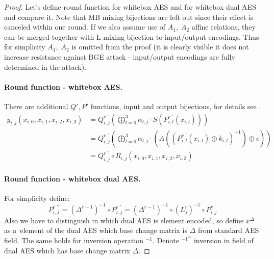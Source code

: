 \documentclass[11pt,oneside,final]{fithesis2}
\begin{document}
	\begin{proof}
	Let's define round function for whitebox AES and for whitebox dual AES and compare it. 
	Note that MB mixing bijections are left out since their effect is canceled within one round. If we also assume use of $A_1, \; A_2$ affine relations,
	they can be merged together with L mixing bijection to input/output encodings. Thus for simplicity $A_1, \; A_2$ is omitted from the proof (it is clearly visible 
	it does not increase resistance against BGE attack - input/output encodings are fully determined in the attack).

	\paragraph*{Round function - whitebox AES.}
	There are additional $Q' ,P' $ functions, input and output bijections, for details see \citep{Chow02white-boxcryptography} \citep{Billet:2004:CWB:2080787.2080809}.
	\begin{subequations}
	\begin{align} 
	y_{i,j}\left(x_{i,0}, x_{i,1}, x_{i,2}, x_{i,3}\right)  &= Q^{r \; \prime}_{i,j}\left( \bigoplus^3_{l=0} \alpha_{l,j} \cdot S \left(P^{r \; \prime}_{i,l}\left(x_{i,l}\right) \right) \right) \\
								&= Q^{r \; \prime}_{i,j}\left( \bigoplus^3_{l=0} \alpha_{l,j} \cdot \left( A \left( \left(P^{r \; \prime}_{i,l}\left(x_{i,l}\right) \oplus k_{i,l} \right)^{-1} \right) \oplus c \right) \right) \\
								&= Q^{r \; \prime}_{i,j} \circ R_{i,j}\left(x_{i,0}, x_{i,1}, x_{i,2}, x_{i,3}\right) \label{eq:whitebox_aes_roud}
	\end{align}
	\end{subequations}

	\paragraph*{Round function - whitebox dual AES.}
	For simplicity define:
	\begin{equation}
	    P^{r \; \prime\prime}_{i,j} = \left(\Delta^{r-1}\right)^{-1} \circ P^{r \; \prime}_{i,j} = \left(\Delta^{r-1}\right)^{-1} \circ (L^{r}_{j})^{-1} \circ P^{r}_{i,j} \label{eq:ioencoding_abstract_p}
	\end{equation}
	Also we have to distinguish in which dual AES is element encoded, so define $x^{\Delta}$ as a~element of the dual AES which base change matrix is $\Delta$ from standard AES field. 
	The same holds for inversion operation $^{-1}$. Denote $^{-1^{\Delta}}$ inversion in field of dual AES which has base change matrix $\Delta$.
	

\end{proof}
\end{document}
